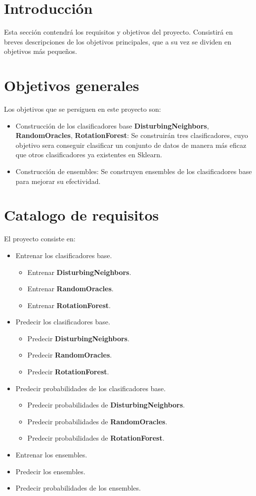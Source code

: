
\section{Introducción}
Esta sección contendrá los requisitos y objetivos del proyecto. Consistirá en breves descripciones de los objetivos principales, que a su vez se dividen en objetivos más pequeños.

\section{Objetivos generales}
Los objetivos que se persiguen en este proyecto son:
\begin{itemize}
	\item Construcción de los clasificadores base \textbf{DisturbingNeighbors}, \textbf{RandomOracles}, \textbf{RotationForest}: Se construirán tres clasificadores, cuyo objetivo sera conseguir clasificar un conjunto de datos de manera más eficaz que otros clasificadores ya existentes en Sklearn.
	\item Construcción de ensembles: Se construyen ensembles de los clasificadores base para mejorar su efectividad. 
\end{itemize}

\section{Catalogo de requisitos}
El proyecto consiste en:
\begin{itemize}
	\item Entrenar los clasificadores base.
	\begin{itemize}
		\item Entrenar  \textbf{DisturbingNeighbors}.
		\item Entrenar  \textbf{RandomOracles}.
		\item Entrenar  \textbf{RotationForest}.
	\end{itemize}
	\item Predecir los clasificadores base.
	\begin{itemize}
		\item Predecir  \textbf{DisturbingNeighbors}.
		\item Predecir  \textbf{RandomOracles}.
		\item Predecir  \textbf{RotationForest}.
	\end{itemize}
	\item Predecir probabilidades de los clasificadores base.
	\begin{itemize}
		\item Predecir probabilidades de \textbf{DisturbingNeighbors}.
		\item Predecir probabilidades de  \textbf{RandomOracles}.
		\item Predecir probabilidades de  \textbf{RotationForest}.
	\end{itemize}
	\item Entrenar los ensembles.
	\item Predecir los ensembles.
	\item Predecir probabilidades de los ensembles.
\end{itemize}
